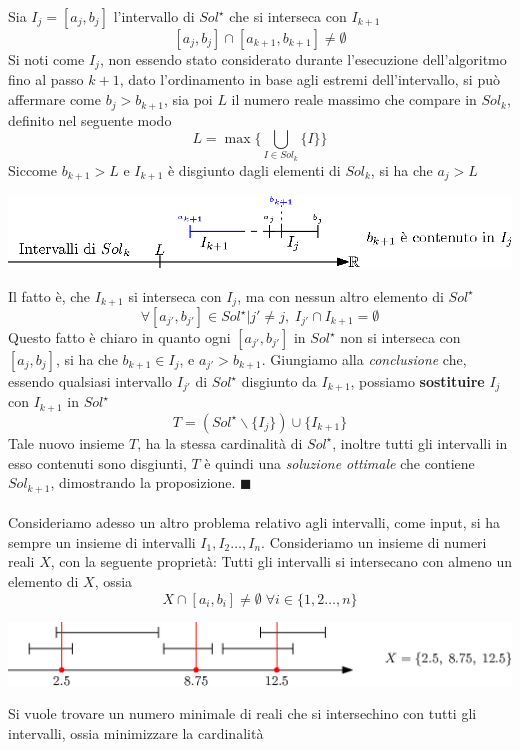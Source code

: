 \documentclass[12pt, letterpaper]{article}
\newcommand{\acc}{\\\hphantom{}\\}
\begin{document}
Sia $I_j=[a_j,b_j]$ l'intervallo di $Sol^\star$ che si interseca con $I_{k+1}$ 
$$ [a_j,b_j]\cap [a_{k+1},b_{k+1}]\ne \emptyset$$ 
Si noti come $I_j$, non essendo stato considerato durante l'esecuzione dell'algoritmo fino al passo $k+1$, dato 
l'ordinamento in base agli estremi dell'intervallo, si può affermare come $b_j>b_{k+1}$, sia poi 
$L$ il numero reale massimo che compare in $Sol_k$, definito nel seguente modo 
$$ L=\max\{\bigcup_{I\in Sol_k}\{I\}\}$$ 
Siccome $b_{k+1}>L$ e $I_{k+1}$ è disgiunto dagli elementi di $Sol_k$, si ha che $a_j>L$
\begin{center}
    \includegraphics[width=1\textwidth ]{images/dimPropIntervalli2.eps}
\end{center}
Il fatto è, che $I_{k+1}$ si interseca con $I_j$, ma con nessun altro elemento di $Sol^\star$
$$ \forall [a_{j'},b_{j'}]\in Sol^\star | j'\ne j, \; I_{j'}\cap I_{k+1}=\emptyset$$
Questo fatto è chiaro in quanto ogni $[a_{j'},b_{j'}]$ in $Sol^\star$ non si interseca con $[a_j,b_j]$, si ha che  
$b_{k+1}\in I_j$, e $a_{j'}>b_{k+1}$. Giungiamo alla \textit{conclusione} che, essendo qualsiasi intervallo $I_{j'}$ di 
$Sol^\star$ disgiunto da $I_{k+1}$, possiamo \textbf{sostituire} $I_j$ con $I_{k+1}$ in $Sol^\star$ 
$$ T=(Sol^\star \backslash \{I_j\})\cup \{I_{k+1}\}$$
Tale nuovo insieme $T$, ha la stessa cardinalità di $Sol^\star$, inoltre tutti gli intervalli in esso contenuti sono 
disgiunti, $T$ è quindi una \textit{soluzione ottimale} che contiene $Sol_{k+1}$, dimostrando la proposizione. $\blacksquare$\acc 
Consideriamo adesso un altro problema relativo agli intervalli, come input, si ha sempre un insieme di 
intervalli $I_1,I_2\dots,I_n$. Consideriamo un insieme di numeri reali $X$, con la seguente proprietà: Tutti gli intervalli 
si intersecano con almeno un elemento di $X$, ossia $$X\cap [a_i,b_i]\ne \emptyset\; \forall i\in\{1,2\dots,n\}$$
\begin{center}
    \includegraphics[width=1\textwidth ]{images/midPointInterset.eps}
\end{center}
Si vuole trovare un numero minimale di reali che si intersechino con tutti gli intervalli, ossia minimizzare la cardinalità 
\end{document}
